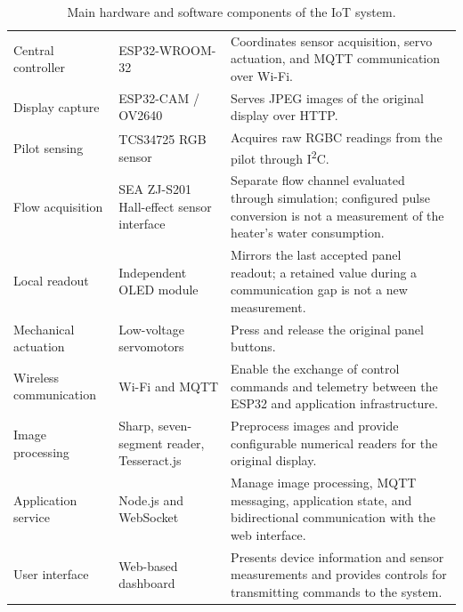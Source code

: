 \begin{table}[htbp]
\centering
\caption{Main hardware and software components of the IoT system.}
\label{tab:components}
\small
\renewcommand{\arraystretch}{1.12}
\begin{tabularx}{\textwidth}{@{}P{2.7cm} P{2.8cm} L@{}}
\toprule
{} &  &  \\
\midrule

Central controller
& ESP32-WROOM-32
& Coordinates sensor acquisition, servo actuation, and MQTT communication over Wi-Fi. \\

Display capture
& ESP32-CAM / OV2640
& Serves JPEG images of the original display over HTTP. \\

Pilot sensing
& TCS34725 RGB sensor
& Acquires raw RGBC readings from the pilot through I\textsuperscript{2}C. \\

Flow acquisition
& SEA ZJ-S201 Hall-effect sensor interface
& Separate flow channel evaluated through simulation; configured pulse conversion is not a measurement of the heater's water consumption. \\

Local readout
& Independent OLED module
& Mirrors the last accepted panel readout; a retained value during a communication gap is not a new measurement. \\

Mechanical actuation
& Low-voltage servomotors
& Press and release the original panel buttons. \\

Wireless communication
& Wi-Fi and MQTT
& Enable the exchange of control commands and telemetry between the ESP32 and application infrastructure. \\

Image processing
& Sharp, seven-segment reader, Tesseract.js
& Preprocess images and provide configurable numerical readers for the original display. \\

Application service
& Node.js and WebSocket
& Manage image processing, MQTT messaging, application state, and bidirectional communication with the web interface. \\

User interface
& Web-based dashboard
& Presents device information and sensor measurements and provides controls for transmitting commands to the system. \\

\bottomrule
\end{tabularx}
\end{table}

